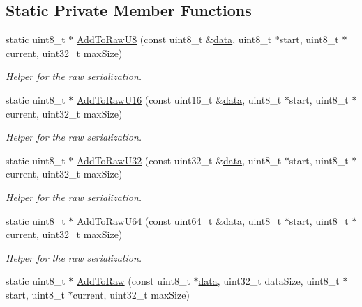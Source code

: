 \subsection*{Static Private Member Functions}
\begin{DoxyCompactItemize}
\item 
static uint8\+\_\+t $\ast$ \hyperlink{classns3_1_1PacketMetadata_acf61c8b898fa059a3c3de4aa03c8c0c3}{Add\+To\+Raw\+U8} (const uint8\+\_\+t \&\hyperlink{topology-example-sim_8cc_a26c65296e316af77b787dc77469bb2a4}{data}, uint8\+\_\+t $\ast$start, uint8\+\_\+t $\ast$current, uint32\+\_\+t max\+Size)
\begin{DoxyCompactList}\small\item\em Helper for the raw serialization. \end{DoxyCompactList}\item 
static uint8\+\_\+t $\ast$ \hyperlink{classns3_1_1PacketMetadata_af48d704fec44aeedcfc257b6eb382e30}{Add\+To\+Raw\+U16} (const uint16\+\_\+t \&\hyperlink{topology-example-sim_8cc_a26c65296e316af77b787dc77469bb2a4}{data}, uint8\+\_\+t $\ast$start, uint8\+\_\+t $\ast$current, uint32\+\_\+t max\+Size)
\begin{DoxyCompactList}\small\item\em Helper for the raw serialization. \end{DoxyCompactList}\item 
static uint8\+\_\+t $\ast$ \hyperlink{classns3_1_1PacketMetadata_a5ae4821ac2aae1d62c02243cdd27572a}{Add\+To\+Raw\+U32} (const uint32\+\_\+t \&\hyperlink{topology-example-sim_8cc_a26c65296e316af77b787dc77469bb2a4}{data}, uint8\+\_\+t $\ast$start, uint8\+\_\+t $\ast$current, uint32\+\_\+t max\+Size)
\begin{DoxyCompactList}\small\item\em Helper for the raw serialization. \end{DoxyCompactList}\item 
static uint8\+\_\+t $\ast$ \hyperlink{classns3_1_1PacketMetadata_af872909b61feca47e71738b83a125b86}{Add\+To\+Raw\+U64} (const uint64\+\_\+t \&\hyperlink{topology-example-sim_8cc_a26c65296e316af77b787dc77469bb2a4}{data}, uint8\+\_\+t $\ast$start, uint8\+\_\+t $\ast$current, uint32\+\_\+t max\+Size)
\begin{DoxyCompactList}\small\item\em Helper for the raw serialization. \end{DoxyCompactList}\item 
static uint8\+\_\+t $\ast$ \hyperlink{classns3_1_1PacketMetadata_add5d8a1457ffc3eb6f3453c2ec924726}{Add\+To\+Raw} (const uint8\+\_\+t $\ast$\hyperlink{topology-example-sim_8cc_a26c65296e316af77b787dc77469bb2a4}{data}, uint32\+\_\+t data\+Size, uint8\+\_\+t $\ast$start, uint8\+\_\+t $\ast$current, uint32\+\_\+t max\+Size)

\end{DoxyCompactItemize}
